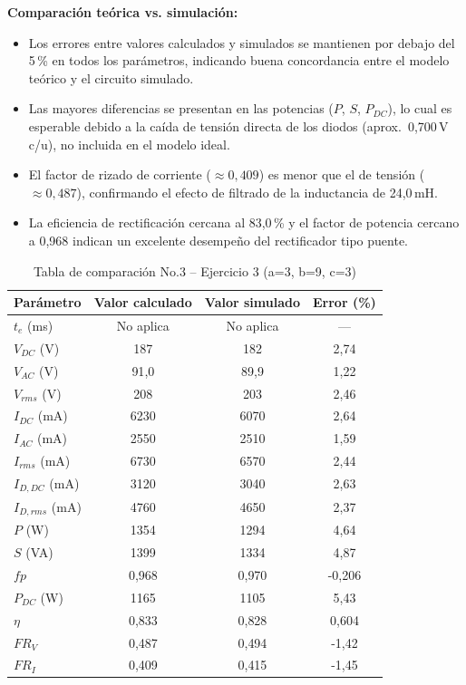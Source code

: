 \documentclass[12pt,a4paper]{article}
\begin{document}
\textbf{Comparación teórica vs. simulación:}
\begin{itemize}
    \item Los errores entre valores calculados y simulados se mantienen por debajo del
    5\,\% en todos los parámetros, indicando buena concordancia entre el modelo teórico
    y el circuito simulado.
    \item Las mayores diferencias se presentan en las potencias ($P$, $S$, $P_{DC}$),
    lo cual es esperable debido a la caída de tensión directa de los diodos
    (aprox.\ 0,700\,V c/u), no incluida en el modelo ideal.
    \item El factor de rizado de corriente ($\approx 0{,}409$) es menor que el de tensión
    ($\approx 0{,}487$), confirmando el efecto de filtrado de la inductancia de 24{,}0\,mH.
    \item La eficiencia de rectificación cercana al 83{,}0\,\% y el factor de potencia
    cercano a 0,968 indican un excelente desempeño del rectificador tipo puente.
\end{itemize}

\begin{table}[h]
\centering
\begin{tabular}{|l|c|c|c|}
\hline
\textbf{Parámetro} & \textbf{Valor calculado} & \textbf{Valor simulado} & \textbf{Error (\%)} \\
\hline
$t_e$ (ms)        & No aplica & No aplica & --- \\
$V_{DC}$ (V)      & 187    & 182 & 2{,}74 \\
$V_{AC}$ (V)      & 91{,}0 & 89{,}9  & 1{,}22 \\
$V_{rms}$ (V)     & 208    & 203     & 2{,}46 \\
$I_{DC}$ (mA)     & 6230   & 6070    & 2{,}64 \\
$I_{AC}$ (mA)     & 2550   & 2510    & 1{,}59 \\
$I_{rms}$ (mA)    & 6730   & 6570    & 2{,}44 \\
$I_{D,DC}$ (mA)   & 3120   & 3040    & 2{,}63\\
$I_{D,rms}$ (mA)  & 4760   & 4650    & 2{,}37 \\
$P$ (W)           & 1354   & 1294    & 4{,}64 \\
$S$ (VA)          & 1399   & 1334    & 4{,}87 \\
$fp$              & 0{,}968 & 0{,}970 & -0{,}206 \\
$P_{DC}$ (W)      & 1165   & 1105    & 5{,}43 \\
$\eta$            & 0{,}833 & 0{,}828 & 0{,}604 \\
$FR_V$            & 0{,}487 & 0{,}494 & -1{,}42 \\
$FR_I$            & 0{,}409 & 0{,}415 & -1{,}45 \\
\hline
\end{tabular}
\caption{Tabla de comparación No.3 -- Ejercicio 3 (a=3, b=9, c=3)}
\end{table}
\end{document}
